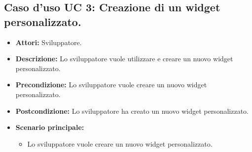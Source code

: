 \subsection{Caso d'uso UC 3: Creazione di un widget personalizzato.}
\label{Caso d'uso UC 3: Creazione di un widget personalizzato.}

\FloatBarrier
\begin{itemize}
\item \textbf{Attori:} Sviluppatore.
\item \textbf{Descrizione:} Lo sviluppatore vuole utilizzare e creare un nuovo widget personalizzato.
\item \textbf{Precondizione:} Lo sviluppatore vuole creare un nuovo widget personalizzato. 
\item \textbf{Postcondizione:} Lo sviluppatore ha creato un nuovo widget personalizzato.
\item \textbf{Scenario principale:}
	\begin{itemize}
	\item{Lo sviluppatore vuole creare un nuovo widget personalizzato.}
	\end{itemize}
\end{itemize}